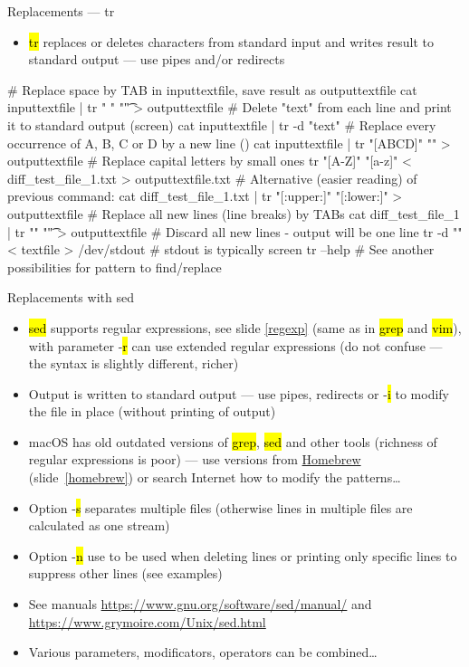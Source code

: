 \documentclass[compress, ucs, xelatex, 11pt, xcolor=svgnames, aspectratio=169,
	hyperref={
		bookmarks=true,
		unicode=true,
		colorlinks=true,
		pdftitle={Linux, command line and MetaCentrum},
		plainpages=false,
		pdfauthor={Vojtech Zeisek},
		pdfsubject={Course about use of Linux command line, writing shell scripts and using MetaCentrum of CESNET},
		pdfcreator={XeLaTeX},
		pdfkeywords={Linux, GNU, BASH, shell, command line, MetaCentrum},
		linkcolor=DarkRed, %
		anchorcolor=DarkBlue, %
		citecolor=Indigo, %
		filecolor=NavyBlue, %
		menucolor=DarkMagenta, %
		urlcolor=DarkBlue, %
		pdftex},
	url={hyphens, lowtilde} %
	]{beamer}
\renewcommand{\texttt}[1]{\hl{\ttfamily #1}}
\begin{document}
\begin{frame}[fragile]{Replacements --- tr}
	\begin{itemize}
		\item \texttt{tr} replaces or deletes characters from standard input and writes result to standard output --- use pipes and/or redirects
	\end{itemize}
	\vfill
	\begin{bashcode}
    # Replace space by TAB in inputtextfile, save result as outputtextfile
    cat inputtextfile | tr " " "\t" > outputtextfile
    # Delete "text" from each line and print it to standard output (screen)
    cat inputtextfile | tr -d "text"
    # Replace every occurrence of A, B, C or D by a new line (\n)
    cat inputtextfile | tr "[ABCD]" "\n" > outputtextfile
    # Replace capital letters by small ones
    tr "[A-Z]" "[a-z]" < diff_test_file_1.txt > outputtextfile.txt
    # Alternative (easier reading) of previous command:
    cat diff_test_file_1.txt | tr "[:upper:]" "[:lower:]" > outputtextfile
    # Replace all new lines (line breaks) by TABs
    cat diff_test_file_1 | tr "\n" "\t"  > outputtextfile
    # Discard all new lines - output will be one line
    tr -d "\n" < textfile > /dev/stdout # stdout is typically screen
    tr --help # See another possibilities for pattern to find/replace
	\end{bashcode}
\end{frame}

\begin{frame}{Replacements with sed}
	\begin{itemize}
		\item \texttt{sed} supports regular expressions, see slide \ref{regexp} (same as in \texttt{grep} and \texttt{vim}), with parameter -\texttt{r} can use extended regular expressions (do not confuse --- the syntax is slightly different, richer)
		\item Output is written to standard output --- use pipes, redirects or -\texttt{i} to modify the file in place (without printing of output)
		\item macOS has old outdated versions of \texttt{grep}, \texttt{sed} and other tools (richness of regular expressions is poor) --- use versions from \href{http://brew.sh/}{Homebrew} (slide~\ref{homebrew}) or search Internet how to modify the patterns\ldots
		\item Option -\texttt{s} separates multiple files (otherwise lines in multiple files are calculated as one stream)
		\item Option -\texttt{n} use to be used when deleting lines or printing only specific lines to suppress other lines (see examples)
		\item See manuals \url{https://www.gnu.org/software/sed/manual/} and \url{https://www.grymoire.com/Unix/sed.html}
		\item Various parameters, modificators, operators can be combined\ldots
	\end{itemize}
\end{frame}
\end{document}
